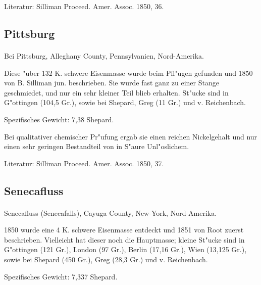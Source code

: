 \documentclass[a4paper, 11pt, oneside]{article}
\begin{document}
\footnotesize
Literatur: Silliman Proceed. Amer. Assoc. 1850, 36.

\subsection{Pittsburg}
\normalsize
\paragraph{}
Bei Pittsburg, Alleghany County, Pennsylvanien, Nord-Amerika.

Diese "uber 132 K. schwere Eisenmasse wurde beim Pfl"ugen gefunden und 1850 von B. Silliman jun. beschrieben. Sie wurde fast ganz zu einer Stange geschmiedet, und nur ein sehr kleiner Teil blieb erhalten. St"ucke sind in G"ottingen (104,5 Gr.), sowie bei Shepard, Greg (11 Gr.) und v. Reichenbach.

Spezifisches Gewicht: 7,38 Shepard.

Bei qualitativer chemischer Pr"ufung ergab sie einen reichen Nickelgehalt und nur einen sehr geringen Bestandteil von in S"aure Unl"oslichem.

\footnotesize
Literatur: Silliman Proceed. Amer. Assoc. 1850, 37.

\subsection{Senecafluss}
\normalsize
\paragraph{}
Senecafluss (Senecafalls), Cayuga County, New-York, Nord-Amerika.

1850 wurde eine 4 K. schwere Eisenmasse entdeckt und 1851 von Root zuerst beschrieben. Vielleicht hat dieser noch die Hauptmasse; kleine St"ucke sind in G"ottingen (121 Gr.), London (97 Gr.), Berlin (17,16 Gr.), Wien (13,125 Gr.), sowie bei Shepard (450 Gr.), Greg (28,3 Gr.) und v. Reichenbach.

Spezifisches Gewicht: 7,337 Shepard.
\end{document}

